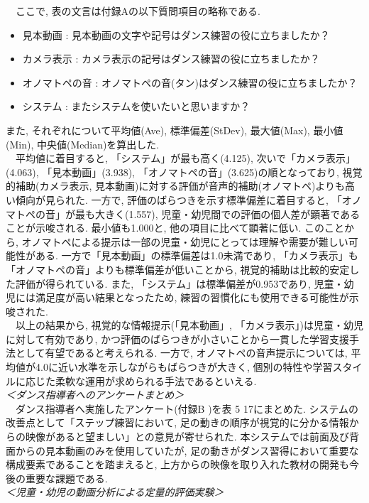 \documentclass[paper]{ieicej}
\begin{document}
　ここで, 表の文言は付録Aの以下質問項目の略称である. 
\begin{itemize}[nosep]
  \item 見本動画 : 見本動画の文字や記号はダンス練習の役に立ちましたか？
  \item カメラ表示 : カメラ表示の記号はダンス練習の役に立ちましたか？
  \item オノマトペの音 : オノマトペの音(タン)はダンス練習の役に立ちましたか？
  \item システム : またシステムを使いたいと思いますか？
\end{itemize}
また, それぞれについて平均値(Ave), 標準偏差(StDev), 最大値(Max), 最小値(Min), 中央値(Median)を算出した. \\
　平均値に着目すると, 「システム」が最も高く(4.125), 次いで「カメラ表示」(4.063), 「見本動画」(3.938), 「オノマトペの音」(3.625)の順となっており, 視覚的補助(カメラ表示, 見本動画)に対する評価が音声的補助(オノマトペ)よりも高い傾向が見られた. 一方で, 評価のばらつきを示す標準偏差に着目すると, 「オノマトペの音」が最も大きく(1.557), 児童・幼児間での評価の個人差が顕著であることが示唆される. 最小値も1.000と, 他の項目に比べて顕著に低い. このことから, オノマトペによる提示は一部の児童・幼児にとっては理解や需要が難しい可能性がある. 一方で「見本動画」の標準偏差は1.0未満であり, 「カメラ表示」も「オノマトペの音」よりも標準偏差が低いことから, 視覚的補助は比較的安定した評価が得られている. また, 「システム」は標準偏差が0.953であり, 児童・幼児には満足度が高い結果となったため, 練習の習慣化にも使用できる可能性が示唆された. \\
　以上の結果から, 視覚的な情報提示(「見本動画」, 「カメラ表示」)は児童・幼児に対して有効であり, かつ評価のばらつきが小さいことから一貫した学習支援手法として有望であると考えられる. 一方で, オノマトペの音声提示については, 平均値が4.0に近い水準を示しながらもばらつきが大きく, 個別の特性や学習スタイルに応じた柔軟な運用が求められる手法であるといえる. \\
\textit{＜ダンス指導者へのアンケートまとめ＞}\\
　ダンス指導者へ実施したアンケート(付録B )を表 5 17にまとめた. システムの改善点として「ステップ練習において, 足の動きの順序が視覚的に分かる情報からの映像があると望ましい」との意見が寄せられた. 本システムでは前面及び背面からの見本動画のみを使用していたが, 足の動きがダンス習得において重要な構成要素であることを踏まえると, 上方からの映像を取り入れた教材の開発も今後の重要な課題である.\\
\textit{＜児童・幼児の動画分析による定量的評価実験＞}\\
\end{document}
